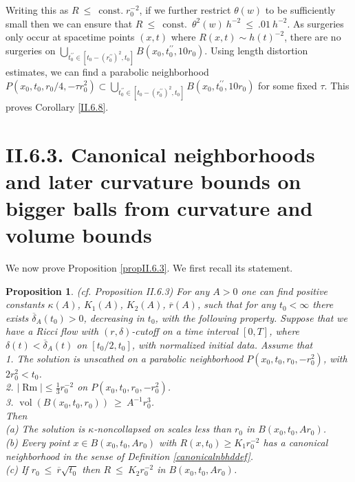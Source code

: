 \documentclass[12pt]{amsart}
\newcommand{\const}{\operatorname{const.}}
\newcommand{\Rm}{\operatorname{Rm}}
\newcommand{\vol}{\operatorname{vol}}
\numberwithin{equation}{section}
\theoremstyle{plain}
\newtheorem{proposition}[equation]{Proposition}
\theoremstyle{definition}
\theoremstyle{remark}
\begin{document}
Writing this as
$R \: \le \: \const r_0^{-2}$,
if we further restrict $\theta(w)$ to be sufficiently
small then we can ensure that $R \: \le \: \const \: \theta^2(w) \: h^{-2}
\: \le \: .01 \: h^{-2}$. As surgeries only occur
at spacetime points $(x,t)$ where
$R(x,t) \sim h(t)^{-2}$,
there are no surgeries on 
$\bigcup_{t_0^{\prime \prime} \in 
[t_0 - (r_0^{\prime \prime})^2, t_0]} B(x_0, t_0^{\prime \prime}, 10 r_0)$. 
Using length distortion estimates,
we can find a parabolic neighborhood 
$P(x_0, t_0, r_0/4, - \tau r_0^2) \subset
\bigcup_{t_0^{\prime \prime} \in 
[t_0 - (r_0^{\prime \prime})^2, t_0]} B(x_0, t_0^{\prime \prime}, 10 r_0)$ 
for some fixed $\tau$.
This proves Corollary \ref{II.6.8}.





\section{II.6.3. Canonical neighborhoods and later curvature bounds on bigger balls from
curvature and volume bounds}
We now prove Proposition \ref{propII.6.3}.
We first recall its statement.
\begin{proposition} 
(cf. Proposition II.6.3) 
For any $A > 0$ one can find positive constants $\kappa(A)$, $K_1(A)$, $K_2(A)$, 
$\overline{r}(A)$,
such that for any $t_0 < \infty$
there exists $\overline{\delta}_{A}(t_0)
> 0$, decreasing in $t_0$, with the following property.  Suppose that
we have a Ricci flow with $(r, \delta)$-cutoff on a time interval
$[0, T]$, where $\delta(t) < \overline{\delta}_A(t)$ on $[t_0/2, t_0]$, with
normalized initial data.  Assume that \\
1. The solution is unscathed on a parabolic neighborhood
$P(x_0, t_0, r_0, -r_0^2)$, with $2r_0^2 < t_0$. \\
2. 
$|\Rm| \le \frac13 r_0^{-2}$
on $P(x_0, t_0, r_0, -r_0^2)$. \\
3. $\vol(B(x_0, t_0, r_0)) \: \ge \: A^{-1} r_0^3$.\\

Then\\
(a) The solution is $\kappa$-noncollapsed on scales less than $r_0$
in $B(x_0, t_0, Ar_0)$.\\
(b) Every point $x \in B(x_0, t_0, Ar_0)$ with $R(x, t_0) \ge K_1 r_0^{-2}$
has a canonical neighborhood in the sense of
Definition \ref{canonicalnbhddef}.\\
(c) If $r_0 \: \le \: \overline{r} \sqrt{t_0}$ then $R \: \le \: K_2
r_0^{-2}$ in $B(x_0, t_0, Ar_0)$.
\end{proposition}
\end{document}
